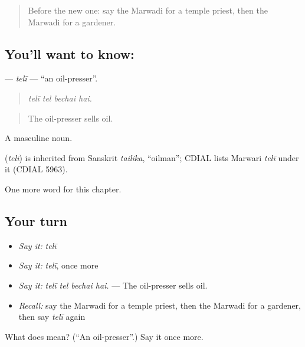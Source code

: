 \begin{quote}
Before the new one: say the Marwadi for a temple priest, then the Marwadi for a gardener.
\end{quote}

\subsection*{You'll want to know: }
\textbf{} — \emph{telī} — \textquotedblleft{}an oil-presser\textquotedblright{}.

\begin{quote}
   
\end{quote}

\begin{quote}
\emph{telī tel bechai hai.}
\end{quote}

\begin{quote}
The oil-presser sells oil.
\end{quote}

A masculine noun.

\begin{cousinweb}
\textbf{} (\emph{telī}) is inherited from Sanskrit \emph{tailika}, \textquotedblleft{}oilman\textquotedblright{}; CDIAL lists Marwari \emph{telī} under it (CDIAL 5963).
\end{cousinweb}

\begin{grammarlens}[title={What you've built}]
One more word for this chapter.
\end{grammarlens}

\subsection*{Your turn}
\begin{itemize}
\raggedright
  \item \emph{Say it:} \emph{telī}
  \item \emph{Say it:} \emph{telī}, once more
  \item \emph{Say it:} \emph{telī tel bechai hai.} — The oil-presser sells oil.
  \item \emph{Recall:} say the Marwadi for a temple priest, then the Marwadi for a gardener, then say \emph{telī} again
\end{itemize}

\begin{tcolorbox}[breakable,colback=teal!4,colframe=teal!35!black,title={Before you move on}]
What does  mean? (\textquotedblleft{}An oil-presser\textquotedblright{}.) Say it once more.
\end{tcolorbox}
